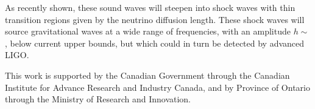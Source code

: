 \documentclass[aps,showpacs,twocolumn,floats,prd,superscriptaddress,nofootinbib]{revtex4}
\begin{document}
As recently shown\cite{2015arXiv151002985P}, these sound waves will
steepen into shock waves with thin transition regions given by the
neutrino diffusion length.  These shock waves will source
gravitational waves at a wide range of frequencies, with an amplitude
$h\sim$, below current upper bounds\cite{2015PhRvD..91b2003A},
but which could in
turn be detected by advanced LIGO.


\acknowledgments


This work is supported by the Canadian Government through the Canadian
Institute for Advance Research and Industry Canada, and by Province of
Ontario through the Ministry of Research and Innovation.

\appendix

%

\end{document}
